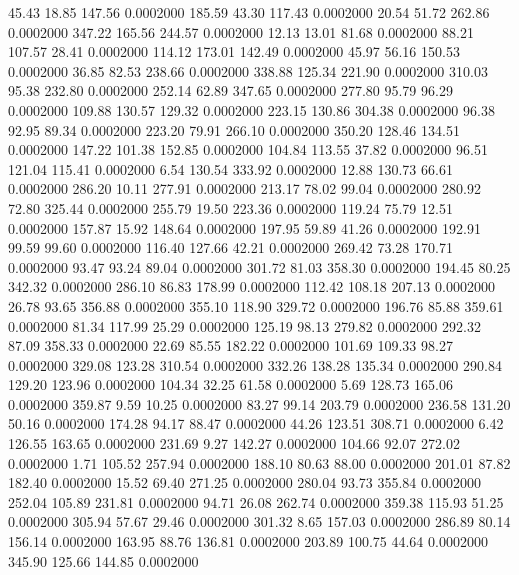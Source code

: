   45.43   18.85  147.56   0.0002000
 185.59   43.30  117.43   0.0002000
  20.54   51.72  262.86   0.0002000
 347.22  165.56  244.57   0.0002000
  12.13   13.01   81.68   0.0002000
  88.21  107.57   28.41   0.0002000
 114.12  173.01  142.49   0.0002000
  45.97   56.16  150.53   0.0002000
  36.85   82.53  238.66   0.0002000
 338.88  125.34  221.90   0.0002000
 310.03   95.38  232.80   0.0002000
 252.14   62.89  347.65   0.0002000
 277.80   95.79   96.29   0.0002000
 109.88  130.57  129.32   0.0002000
 223.15  130.86  304.38   0.0002000
  96.38   92.95   89.34   0.0002000
 223.20   79.91  266.10   0.0002000
 350.20  128.46  134.51   0.0002000
 147.22  101.38  152.85   0.0002000
 104.84  113.55   37.82   0.0002000
  96.51  121.04  115.41   0.0002000
   6.54  130.54  333.92   0.0002000
  12.88  130.73   66.61   0.0002000
 286.20   10.11  277.91   0.0002000
 213.17   78.02   99.04   0.0002000
 280.92   72.80  325.44   0.0002000
 255.79   19.50  223.36   0.0002000
 119.24   75.79   12.51   0.0002000
 157.87   15.92  148.64   0.0002000
 197.95   59.89   41.26   0.0002000
 192.91   99.59   99.60   0.0002000
 116.40  127.66   42.21   0.0002000
 269.42   73.28  170.71   0.0002000
  93.47   93.24   89.04   0.0002000
 301.72   81.03  358.30   0.0002000
 194.45   80.25  342.32   0.0002000
 286.10   86.83  178.99   0.0002000
 112.42  108.18  207.13   0.0002000
  26.78   93.65  356.88   0.0002000
 355.10  118.90  329.72   0.0002000
 196.76   85.88  359.61   0.0002000
  81.34  117.99   25.29   0.0002000
 125.19   98.13  279.82   0.0002000
 292.32   87.09  358.33   0.0002000
  22.69   85.55  182.22   0.0002000
 101.69  109.33   98.27   0.0002000
 329.08  123.28  310.54   0.0002000
 332.26  138.28  135.34   0.0002000
 290.84  129.20  123.96   0.0002000
 104.34   32.25   61.58   0.0002000
   5.69  128.73  165.06   0.0002000
 359.87    9.59   10.25   0.0002000
  83.27   99.14  203.79   0.0002000
 236.58  131.20   50.16   0.0002000
 174.28   94.17   88.47   0.0002000
  44.26  123.51  308.71   0.0002000
   6.42  126.55  163.65   0.0002000
 231.69    9.27  142.27   0.0002000
 104.66   92.07  272.02   0.0002000
   1.71  105.52  257.94   0.0002000
 188.10   80.63   88.00   0.0002000
 201.01   87.82  182.40   0.0002000
  15.52   69.40  271.25   0.0002000
 280.04   93.73  355.84   0.0002000
 252.04  105.89  231.81   0.0002000
  94.71   26.08  262.74   0.0002000
 359.38  115.93   51.25   0.0002000
 305.94   57.67   29.46   0.0002000
 301.32    8.65  157.03   0.0002000
 286.89   80.14  156.14   0.0002000
 163.95   88.76  136.81   0.0002000
 203.89  100.75   44.64   0.0002000
 345.90  125.66  144.85   0.0002000
